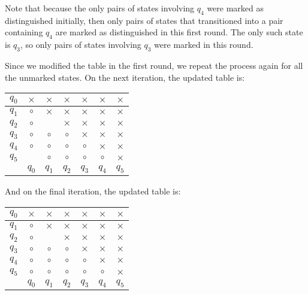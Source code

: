 \documentclass[11pt]{book}
\begin{document}
\vspace{1em}

Note that because the only pairs of states involving $q_4$ were marked as distinguished initially, then only pairs of states that transitioned into a pair containing $q_4$ are marked as distinguished in this first round.
The only such state is $q_3$, so only pairs of states involving $q_3$ were marked in this round.

Since we modified the table in the first round, we repeat the process again for all the unmarked states.
On the next iteration, the updated table is:

\vspace{1em}

\begin{tabular}{|c|c|c|c|c|c|c|}
  \hline
  $q_0$ & $\times$ & $\times$ & $\times$ & $\times$ & $\times$ & $\times$ \\
  \hline
  $q_1$ & $\circ$  & $\times$ & $\times$ & $\times$ & $\times$ & $\times$ \\
  \hline
  $q_2$ & $\circ$  &          & $\times$ & $\times$ & $\times$ & $\times$ \\
  \hline
  $q_3$ & $\circ$  & $\circ$  & $\circ$  & $\times$ & $\times$ & $\times$ \\
  \hline
  $q_4$ & $\circ$  & $\circ$  & $\circ$  & $\circ$  & $\times$ & $\times$ \\
  \hline
  $q_5$ &          & $\circ$  & $\circ$  & $\circ$  & $\circ$  & $\times$ \\
  \hline
        & $q_0$    & $q_1$    & $q_2$    & $q_3$    & $q_4$    & $q_5$    \\
  \hline
\end{tabular}

\vspace{1em}

And on the final iteration, the updated table is:

\vspace{1em}

\begin{tabular}{|c|c|c|c|c|c|c|}
  \hline
  $q_0$ & $\times$ & $\times$ & $\times$ & $\times$ & $\times$ & $\times$ \\
  \hline
  $q_1$ & $\circ$  & $\times$ & $\times$ & $\times$ & $\times$ & $\times$ \\
  \hline
  $q_2$ & $\circ$  &          & $\times$ & $\times$ & $\times$ & $\times$ \\
  \hline
  $q_3$ & $\circ$  & $\circ$  & $\circ$  & $\times$ & $\times$ & $\times$ \\
  \hline
  $q_4$ & $\circ$  & $\circ$  & $\circ$  & $\circ$  & $\times$ & $\times$ \\
  \hline
  $q_5$ & $\circ$  & $\circ$  & $\circ$  & $\circ$  & $\circ$  & $\times$ \\
  \hline
        & $q_0$    & $q_1$    & $q_2$    & $q_3$    & $q_4$    & $q_5$    \\
  \hline
\end{tabular}
\end{document}
